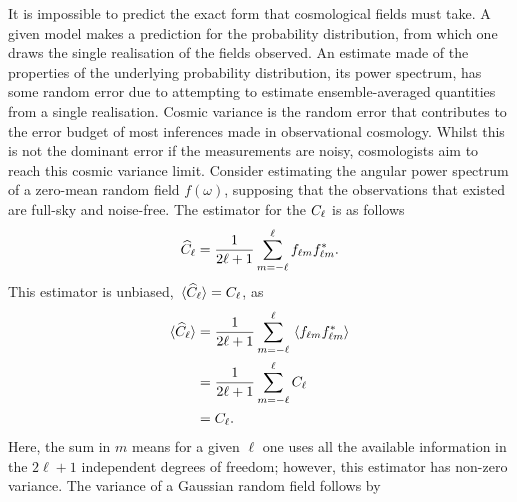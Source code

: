 It is impossible to predict the exact form that cosmological fields must take.
A given model makes a prediction for the probability distribution, from which one draws the single realisation of the fields observed.
An estimate made of the properties of the underlying probability distribution, \ie{} its power spectrum, has some random error due to attempting to estimate ensemble-averaged quantities from a single realisation.
Cosmic variance is the random error that contributes to the error budget of most inferences made in observational cosmology.
Whilst this is not the dominant error if the measurements are noisy, cosmologists aim to reach this cosmic variance limit.
Consider estimating the angular power spectrum of a zero-mean random field \(f(\omega)\), supposing that the observations that existed are full-sky and noise-free.
The estimator for the \(C_{\ell}{}\) is as follows
%
\begin{equation}
	\widehat{C}_{\ell}
	= \frac{1}{2\ell+1} \sum\limits_{m=-\ell}^{\ell} {f}_{\ell m} {f}_{\ell m}^{\ast}.
\end{equation}
%
This estimator is unbiased, \ie{} \(\expval*{\widehat{C}_{\ell}} = C_{\ell}{}\), as
%
\begin{align}
	\expval*{\widehat{C}_{\ell}}
	 & = \frac{1}{2\ell+1} \sum\limits_{m=-\ell}^{\ell} \expval*{{f}_{\ell m} {f}_{\ell m}^{\ast}} \nonumber{} \\
	 & = \frac{1}{2\ell+1} \sum\limits_{m=-\ell}^{\ell} C_{\ell} \nonumber{}                             \\
	 & = C_{\ell}.
\end{align}
%
Here, the sum in \(m\) means for a given \(\ell{}\) one uses all the available information in the \(2\ell+1\) independent degrees of freedom; however, this estimator has non-zero variance.
The variance of a Gaussian random field follows by
%
